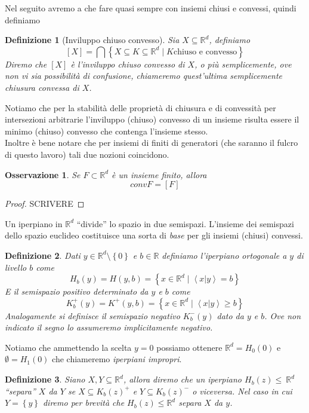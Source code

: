 \documentclass[a4paper,12pt,italian]{article}
\newcommand{\Rd}{\mathbb{R}^d}
\newtheorem{defin}{Definizione}
\newtheorem{oss}{Osservazione}
\begin{document}
Nel seguito avremo a che fare quasi sempre con insiemi chiusi e convessi, quindi definiamo
\begin{defin}[Inviluppo chiuso convesso]
Sia $X\subseteq\Rd$, definiamo
\begin{equation}
\left[X\right]=\bigcap\left\{X\subseteq K\subseteq\Rd\mid K\text{chiuso e convesso}\right\}
\end{equation}
Diremo che $\left[X\right]$ \`e l'inviluppo chiuso convesso di $X$, o pi\`u semplicemente, ove non vi sia possibilit\`a 
di confusione, chiameremo quest'ultima semplicemente \emph{chiusura convessa} di $X$.\\
\end{defin}
Notiamo che per la stabilit\`a delle propriet\`a di chiusura e di convessit\`a per intersezioni arbitrarie l'inviluppo (chiuso) convesso
di un insieme risulta essere il minimo (chiuso) convesso che contenga l'insieme stesso.\\
Inoltre \`e bene notare che per insiemi di finiti di generatori (che saranno il fulcro di questo lavoro) tali due nozioni coincidono.
\begin{oss}
\label{ChiusureOss}
Se $F\subset\Rd$ \`e un insieme finito, allora
\begin{equation*}
convF=\left[F\right]
\end{equation*}
\end{oss}
\begin{proof}
SCRIVERE    %
\end{proof}
Un iperpiano in $\Rd$ ``divide'' lo spazio in due semispazi. L'insieme dei semispazi dello spazio euclideo costituisce una
sorta di \emph{base} per gli insiemi (chiusi) convessi.
\begin{defin}
Dati $y\in\Rd\setminus\left\{0\right\}$ e $b\in\mathbb{R}$ definiamo l'iperpiano ortogonale a $y$ di livello $b$ come
\begin{equation}
H_b(y)=H(y,b)=\left\{x\in\Rd\mid\left<x|y\right>=b\right\}
\end{equation}
E il semispazio positivo determinato da $y$ e $b$ come
\begin{equation}
K^+_b(y)=K^+(y,b)=\left\{x\in\Rd\mid\left<x|y\right>\geq b\right\}
\end{equation}
Analogamente si definisce il semispazio negativo $K^-_b(y)$ dato da $y$ e $b$.
Ove non indicato il segno lo assumeremo implicitamente \emph{negativo}.
\end{defin}
Notiamo che ammettendo la scelta $y=0$ possiamo ottenere $\Rd=H_0(0)$ e $\emptyset=H_1(0)$ che chiameremo \emph{iperpiani impropri}.\\
\begin{defin}
Siano $X,Y\subseteq\Rd$, allora diremo che un iperpiano $H_b(z)\leq~\Rd$ ``separa'' $X$ da $Y$ se
$X\subseteq K_b(z)^+$ e $Y\subseteq K_b(z)^-$ o viceversa. Nel caso in cui $Y=\left\{y\right\}$ diremo per brevit\`a che
$H_b(z)\leq\Rd$ separa $X$ da $y$.
\end{defin}
\end{document}
